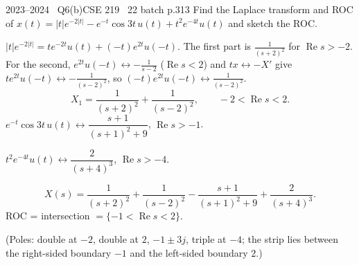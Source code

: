 \begin{qcard}{2023--2024 \textbullet\ Q6(b)}{CSE 219 \textbullet\ 22 batch p.3}{13}
Find the Laplace transform and ROC of $x(t)=|t|e^{-2|t|}-e^{-t}\cos3t\,u(t)+t^2e^{-4t}u(t)$ and sketch the ROC.
\end{qcard}
\begin{solution}
 $|t|e^{-2|t|}=te^{-2t}u(t)+(-t)e^{2t}u(-t)$. The first part is $\frac1{(s+2)^2}$ for $\operatorname{Re}s>-2$. For the second, $e^{2t}u(-t)\leftrightarrow-\frac1{s-2}$ ($\operatorname{Re}s<2$) and $tx\leftrightarrow-X'$ give $te^{2t}u(-t)\leftrightarrow-\frac{1}{(s-2)^2}$, so $(-t)e^{2t}u(-t)\leftrightarrow\frac1{(s-2)^2}$.
\[X_1=\frac1{(s+2)^2}+\frac1{(s-2)^2},\qquad-2<\operatorname{Re}s<2 .\]
 $e^{-t}\cos3t\,u(t)\leftrightarrow\dfrac{s+1}{(s+1)^2+9}$, $\operatorname{Re}s>-1$.

 $t^2e^{-4t}u(t)\leftrightarrow\dfrac{2}{(s+4)^3}$, $\operatorname{Re}s>-4$.

\[X(s)=\frac1{(s+2)^2}+\frac1{(s-2)^2}-\frac{s+1}{(s+1)^2+9}+\frac2{(s+4)^3}.\]
ROC = intersection $=\{-1<\operatorname{Re}s<2\}$.
\begin{center}\end{center}
(Poles: double at $-2$, double at $2$, $-1\pm3j$, triple at $-4$; the strip lies between the right-sided boundary $-1$ and the left-sided boundary $2$.)
\end{solution}

